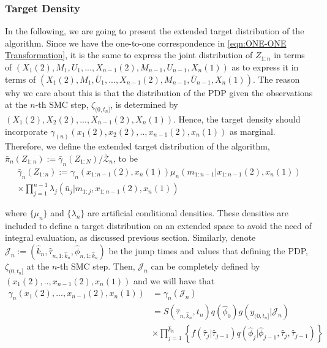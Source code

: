\documentclass[12pt,a4paper]{article}
\begin{document}
\subsubsection{Target Density}
In the following, we are going to present the extended target distribution of the algorithm. Since we have the one-to-one correspondence in \eqref{eqn:ONE-ONE Transformation}, it is the same to express the joint distribution of $Z_{1:n}$ in terms of 
$\left(X_1(2),M_1,U_1,...,X_{n-1}(2),M_{n-1},U_{n-1},X_n(1)\right)$ as to express it in terms of $\left(X_{1}(2),M_{1},\bar{U}_{1},...,X_{n-1}(2),M_{n-1}, \allowbreak \bar{U}_{n-1},X_n(1)\right)$. The reason why we care about this is that the distribution of the PDP given the observations at the $n$-th SMC step, $\zeta_{(0,t_n]}$, is determined by $\left(X_{1}(2),X_{2}(2),...,X_{n-1}(2),X_n(1)\right)$. Hence, the target density should incorporate \(\gamma_(n)(x_1(2),x_2(2),..,x_{n-1}(2),x_n(1))\) as marginal. Therefore, we define the extended target distribution of the algorithm, $\bar{\pi}_n(Z_{1:n}) := \bar{\gamma}_n(Z_{1:N})/\bar{\mathcal{Z}}_n$, to be 
\begin{multline}
    \label{Block-VRPF Target}
    \bar{\gamma}_n\left(Z_{1:n}\right) := \gamma_n(x_{1:n-1}(2),x_n(1))\mu_n\left(m_{1:n-1}|x_{1:n-1}(2),x_n(1)\right)\\
    \times \prod_{j=1}^{n-1} \lambda_j\left(\bar{u}_{j} | m_{1:j},x_{1:n-1}(2),x_n(1)\right) 
\end{multline}

where \(\{\mu_n\}\) and \(\{\lambda_n\}\) are artificial conditional densities. These densities are included to define a target distribution on an extended space to avoid the need of integral evaluation, as discussed previous section. Similarly, denote $\mathcal{J}_n := \left(\hat{k}_n,\hat{\tau}_{n,1:\hat{k}_n},\hat{\phi}_{n,1:\hat{k}_n}\right)$ be the jump times and values that defining the PDP, $\zeta_{(0,t_n]}$ at the $n$-th SMC step. Then, \(\mathcal{J}_n\) can be completely defined by \((x_1(2),..,x_{n-1}(2),x_n(1))\) and we will have that 
\begin{equation*}
    \begin{split}
        \gamma_n\left(x_{1}(2),...,x_{n-1}(2),x_n(1)\right) &= \gamma_n\left(\mathcal{J}_n\right)\\
        &= S\left(\hat{\tau}_{n,\hat{k}_n},t_n\right)q\left(\hat{\phi}_0\right)g\left(y_{(0,t_n]}|\mathcal{J}_n\right)\\
        & \times \prod_{j=1}^{\hat{k}_n} \left\{f\left(\hat{\tau}_j|\hat{\tau}_{j-1}\right)q\left(\hat{\phi}_{j}|\hat{\phi}_{j-1},\hat{\tau}_{j},\hat{\tau}_{j-1}\right)\right\}
    \end{split}
\end{equation*}
\end{document}
